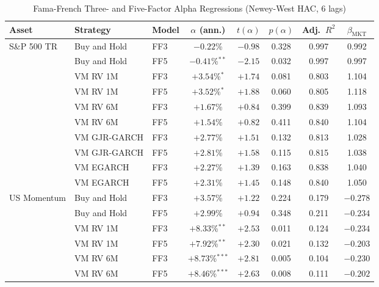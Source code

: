 \documentclass[12pt, a4paper]{article}
\begin{document}
\begin{table}[H]
  \centering
  \caption{Fama-French Three- and Five-Factor Alpha Regressions (Newey-West HAC, 6 lags)}
  \label{tab:ff}
  \footnotesize
  \begin{tabular}{lllccccc}
    \toprule
    \textbf{Asset} & \textbf{Strategy} & \textbf{Model}
      & \textbf{$\alpha$ (ann.)} & \textbf{$t(\alpha)$} & \textbf{$p(\alpha)$}
      & \textbf{Adj.\ $R^2$} & \textbf{$\beta_{\mathrm{MKT}}$} \\
    \midrule
    \multirow{10}{*}{S\&P 500 TR}
      & Buy and Hold   & FF3 & $-0.22$\%    & $-0.98$ & 0.328 & 0.997 & 0.992 \\
      & Buy and Hold   & FF5 & $-0.41$\%$^{**}$    & $-2.15$ & 0.032 & 0.997 & 0.997 \\
      & VM RV 1M       & FF3 & $+3.54$\%$^{*}$  & $+1.74$ & 0.081 & 0.803 & 1.104 \\
      & VM RV 1M       & FF5 & $+3.52$\%$^{*}$  & $+1.88$ & 0.060 & 0.805 & 1.118 \\
      & VM RV 6M       & FF3 & $+1.67$\%     & $+0.84$ & 0.399 & 0.839 & 1.093 \\
      & VM RV 6M       & FF5 & $+1.54$\%     & $+0.82$ & 0.411 & 0.840 & 1.104 \\
      & VM GJR-GARCH   & FF3 & $+2.77$\%     & $+1.51$ & 0.132 & 0.813 & 1.028 \\
      & VM GJR-GARCH   & FF5 & $+2.81$\%     & $+1.58$ & 0.115 & 0.815 & 1.038 \\
      & VM EGARCH      & FF3 & $+2.27$\%     & $+1.39$ & 0.163 & 0.838 & 1.040 \\
      & VM EGARCH      & FF5 & $+2.31$\%     & $+1.45$ & 0.148 & 0.840 & 1.050 \\
    \midrule
    \multirow{10}{*}{US Momentum}
      & Buy and Hold   & FF3 & $+3.57$\%     & $+1.22$ & 0.224 & 0.179 & $-0.278$ \\
      & Buy and Hold   & FF5 & $+2.99$\%     & $+0.94$ & 0.348 & 0.211 & $-0.234$ \\
      & VM RV 1M       & FF3 & $+8.33$\%$^{**}$  & $+2.53$ & 0.011 & 0.124 & $-0.234$ \\
      & VM RV 1M       & FF5 & $+7.92$\%$^{**}$  & $+2.30$ & 0.021 & 0.132 & $-0.203$ \\
      & VM RV 6M       & FF3 & $+8.73$\%$^{***}$ & $+2.81$ & 0.005 & 0.104 & $-0.230$ \\
      & VM RV 6M       & FF5 & $+8.46$\%$^{***}$ & $+2.63$ & 0.008 & 0.111 & $-0.202$ \\

\end{tabular}
\end{table}
\end{document}
